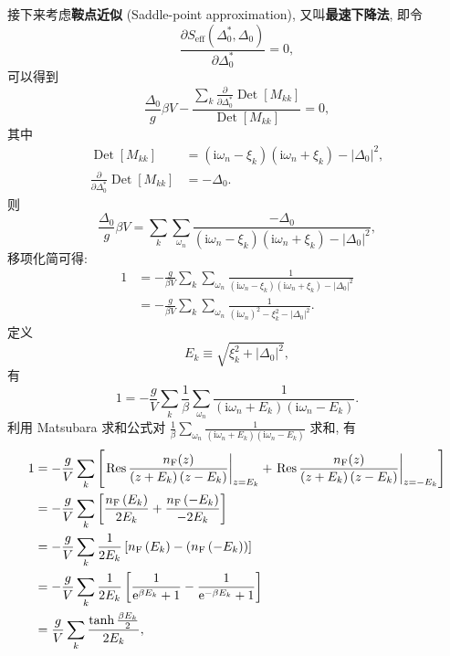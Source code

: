 接下来考虑\textbf{鞍点近似} (Saddle-point approximation), 又叫\textbf{最速下降法}, 即令
\begin{equation}
\frac{\partial S_{\operatorname{eff}}\left(\Delta_0^{*}, \Delta^{}_0\right) }{\partial\Delta_0^{*} }=0,
\end{equation} 
可以得到
\begin{equation}
\frac{\Delta_0}{g} \beta V-\frac{\sum\limits_{k} \frac{\partial}{\partial \Delta_0^{*}} \operatorname{Det}\left[M_{k k}\right]}{\operatorname{Det}\left[M_{k k}\right]}=0,
\end{equation}
其中
\begin{align}
\operatorname{Det}\left[M_{k k}\right]&=\left(\mathrm{i} \omega_{n}- \xi_{k}\right)\left(\mathrm{i} \omega_{n}+\xi_{k}\right)-|\Delta_0|^{2} ,\nonumber \\
\frac{\partial}{\partial \Delta_{0}^{*}} \operatorname{Det}\left[M_{k k}\right]&=-\Delta_0.
\end{align}
则
\begin{equation}
\frac{\Delta_0}{g} \beta V=\sum_{k}\sum_{\omega_n}\frac{ -\Delta_0}{\left(\mathrm{i} \omega_{n}- \xi_{k}\right)\left(\mathrm{i} \omega_{n}+\xi_{k}\right)-|\Delta_0|^{2} },
\end{equation}
移项化简可得:
\begin{align}
1&=-\frac{g}{\beta V}\sum_{k}\sum_{\omega_n}\frac{1}{\left(\mathrm{i} \omega_{n}- \xi_{k}\right)\left(\mathrm{i} \omega_{n}+\xi_{k}\right)-|\Delta_0|^{2} }\nonumber\\
&=-\frac{g}{\beta V}\sum_{k}\sum_{\omega_n}\frac{1}{\left(\mathrm{i} \omega_{n}\right)^2-\xi_{k}^2-|\Delta_0|^{2} }.
\end{align}
定义
\begin{equation}
E_k \equiv \sqrt{\xi_{k}^2+|\Delta_0|^{2}},
\end{equation}
有
\begin{equation}
1=-\frac{g}{V}\sum_{k}\frac{1}{\beta} \sum_{\omega_{n}} \frac{1}{\left(\mathrm i \omega_{n}+E_{k}\right)\left(\mathrm i \omega_{n}-E_{k}\right)}.
\end{equation}
利用 Matsubara 求和公式对 $\displaystyle \frac{1}{\beta} \sum_{\omega_{n}} \frac{1}{\left(\mathrm i \omega_{n}+E_{k}\right)\left(\mathrm i \omega_{n}-E_{k}\right)}$ 求和, 有
\begin{align}
1&=-\frac{g}{V}\sum_{k}\left[\left.\operatorname{Res} \frac{n_{\mathrm{F}}(z)}{\left(z+E_{k}\right)\left(z-E_{k}\right)}\right|_{z=E_{k}}+\left.\operatorname{Res} \frac{n_{\mathrm{F}}(z)}{\left(z+E_{k}\right)\left(z-E_{k}\right)}\right|_{z=-E_{k}}\right] \nonumber\\
&=-\frac{g}{V}\sum_{k}\left[\frac{n_{\mathrm{F}}\left(E_{k}\right)}{2 E_{k}}+\frac{n_{\mathrm{F}}\left(-E_{k}\right)}{-2 E_{k}}\right]\nonumber \\
&=-\frac{g}{V}\sum_{k}\frac{1}{2 E_{k}}\left[n_{\mathrm{F}}\left(E_{k}\right)-\left(n_{\mathrm{F}}\left(-E_{k}\right)\right)\right] \nonumber\\
&=-\frac{g}{V}\sum_{k}\frac{1}{2 E_{k}}\left[\frac{1}{\mathrm{e}^{\beta E_k}+1}-\frac{1}{\mathrm{e}^{-\beta E_k}+1}\right] \nonumber\\
&=\frac{g}{V}\sum_{k}\frac{\tanh \frac{\beta E_{k}}{2}}{2 E_{k}},
\end{align}
